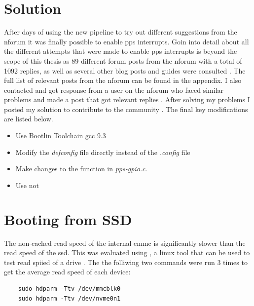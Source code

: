\section{Solution}
After days of using the new pipeline to try out different suggestions from the \gls{nforum} it was finally possible to enable \gls{pps} interrupts.
Goin into detail about all the different attempts that were made to enable \gls{pps} interrupts is beyond the scope of this thesis as 89 different forum posts from the \gls{nforum} with a total of 1092 replies, as well as several other blog posts and guides were consulted \cite{nvidiaNVIDIAJetsonLinux2023} \cite{nvidiaNVIDIATEGRALINUX} \cite{nvidiaNVIDIAJetsonLinux} \cite{nulizhuanzhuAGXXavier35} \cite{fishotterprojectEnablePpsSupport}.
The full list of relevant posts from the \gls{nforum} can be found in the appendix.
I also contacted and got response from a user on the \gls{nforum} who faced similar problems \cite{mhtechdevProgressPPS2023} and made a post that got relevant replies \cite{martensEnablePPSJetson2023}.
After solving my problems I posted my solution to contribute to the community \cite{martensEnablePPSJetson2023}.
The final key modifications are listed below.
\begin{itemize}
    \item Use Bootlin Toolchain gcc 9.3
    \item Modify the \textit{defconfig} file directly instead of the \textit{.config} file
    \item Make changes to the  function in \textit{pps-gpio.c}.
    \item Use  not 
\end{itemize}





\section{Booting from SSD}
The non-cached read speed of the internal \gls{emmc} is significantly slower than the read speed of the \gls{ssd}.
This was evaluated using , a linux tool that can be used to test read spiied of a drive \cite{lordHdparmLinuxManual2018}.
The the folliwing two commands were run 3 times to get the average read speed of each device:
\begin{verbatim}
    sudo hdparm -Ttv /dev/mmcblk0 
    sudo hdparm -Ttv /dev/nvme0n1 
\end{verbatim}

